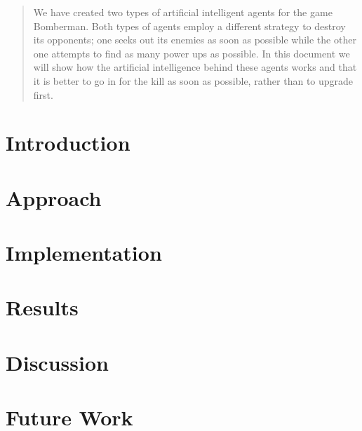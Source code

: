 \documentclass[a4paper, 11pt]{article}
\begin{document}

\newpage



\begin{abstract}
We have created two types of artificial intelligent agents for the game
Bomberman. Both types of agents employ a different strategy to destroy
its opponents; one seeks out its enemies as soon as possible while the other
one attempts to find as many power ups as possible. In this document we will
show how the artificial intelligence behind these agents works and that it
is better to go in for the kill as soon as possible, rather than to upgrade
first.
\end{abstract}

\section{Introduction}


%

\section{Approach}


\section{Implementation}
\label{sec:implementation}


%

\section{Results}


\section{Discussion}


\section{Future Work}





%
\end{document}
